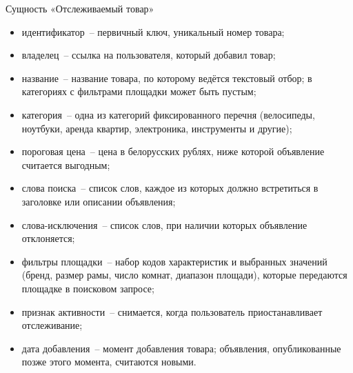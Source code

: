 Сущность «Отслеживаемый товар»
\begin{itemize}
	\item идентификатор~-- первичный ключ, уникальный номер товара;
	\item владелец~-- ссылка на пользователя, который добавил товар;
	\item название~-- название товара, по которому ведётся текстовый отбор; в категориях с фильтрами площадки может быть пустым;
	\item категория~-- одна из категорий фиксированного перечня (велосипеды, ноутбуки, аренда квартир, электроника, инструменты и другие);
	\item пороговая цена~-- цена в белорусских рублях, ниже которой объявление считается выгодным;
	\item слова поиска~-- список слов, каждое из которых должно встретиться в заголовке или описании объявления;
	\item слова-исключения~-- список слов, при наличии которых объявление отклоняется;
	\item фильтры площадки~-- набор кодов характеристик и выбранных значений (бренд, размер рамы, число комнат, диапазон площади), которые передаются площадке в поисковом запросе;
	\item признак активности~-- снимается, когда пользователь приостанавливает отслеживание;
	\item дата добавления~-- момент добавления товара; объявления, опубликованные позже этого момента, считаются новыми.
\end{itemize}

